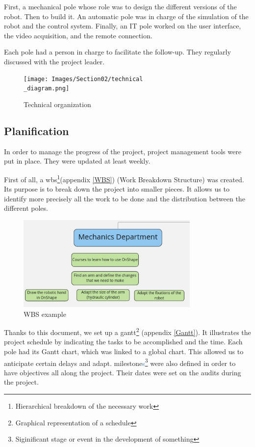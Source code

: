 \bigbreak
First, a mechanical pole whose role was to design the different versions of the robot. Then to build it. An automatic pole was in charge of the simulation of the robot and the control system. Finally, an IT pole worked on the user interface, the video acquisition, and the remote connection.

\bigbreak
Each pole had a person in charge to facilitate the follow-up. They regularly discussed with the project leader.

\begin{figure}[ht]
    \centering
    \texttt{[image: Images/Section02/technical\\\_diagram.png]}
    \caption{Technical organization}
    \label{fig:techOrga}
\end{figure}
\FloatBarrier

\subsection{Planification}
\label{Pla}
In order to manage the progress of the project, project management tools were put in place. They were updated at least weekly.

\bigbreak
First of all, a \gls{wbs}\footnote{Hierarchical breakdown of the necessary work}(appendix \ref{WBS}) (Work Breakdown Structure) was created. Its purpose is to break down the project into smaller pieces. It allows us to identify more precisely all the work to be done and the distribution between the different poles. 

\begin{figure}[ht]
    \centering
    \includegraphics[width=0.8\textwidth]{Images/Section02/wbs.png}
    \caption{WBS example}
    \label{fig:WBSextract}
\end{figure}
\FloatBarrier

\bigbreak
Thanks to this document, we set up a \gls{gantt}\footnote{Graphical representation of a schedule} (appendix \ref{Gantt}). It illustrates the project schedule by indicating the tasks to be accomplished and the time. Each pole had its Gantt chart, which was linked to a global chart. This allowed us to anticipate certain delays and adapt. \Gls{milestone}\textcolor{SteelBlue}{s}\footnote{Siginificant stage or event in the development of something} were also defined in order to have objectives all along the project. Their dates were set on the audits during the project.


